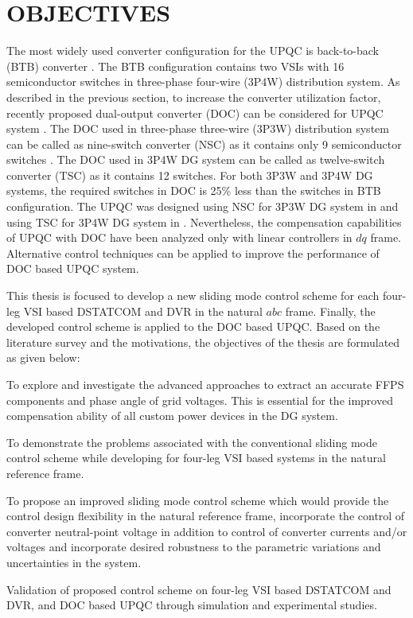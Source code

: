  \section{OBJECTIVES}

The most widely used converter configuration for the UPQC is back-to-back (BTB) converter \cite{6095377, iet-pel.2010.0134, 5688329,5393074, ghosh2001unified, 5235743,5672403, 4483694}. The BTB configuration contains two VSIs with 16 semiconductor switches in three-phase four-wire (3P4W) distribution system. As described in the previous section, to increase the converter utilization factor, recently proposed dual-output converter (DOC) can be considered for UPQC system \cite{4348103}. The DOC used in three-phase three-wire (3P3W) distribution system can be called as nine-switch converter (NSC) as it contains only 9 semiconductor switches \cite{5713844}.  The DOC used in 3P4W DG system can be called as twelve-switch converter (TSC) as it contains 12 switches. For both 3P3W and 3P4W DG systems, the required switches in DOC is 25\% less than the switches in BTB configuration. The UPQC was designed using NSC for 3P3W DG system in \cite{5713844,7018088} and using TSC for 3P4W DG system in \cite{6301686}. Nevertheless, the compensation capabilities of UPQC with DOC have been analyzed only with linear controllers in $dq$ frame. Alternative control techniques can be applied to improve the performance of DOC based UPQC system.    

This thesis is focused to develop a new sliding mode control scheme for each four-leg VSI based DSTATCOM and DVR in the natural $abc$ frame. Finally, the developed control scheme is applied to the DOC based UPQC. Based on the literature survey and the motivations, the objectives of the thesis are formulated as given below:

\begin{enumerate}
\begin{spacing}{1.5}
\item To explore and investigate the advanced approaches to extract an accurate FFPS components and phase angle of grid voltages. This is essential for the improved compensation ability of all custom power devices in the DG system.

\item{To demonstrate the problems associated with the conventional sliding mode control scheme while developing for four-leg VSI based systems in the natural reference frame.} 

\item To propose an improved sliding mode control scheme which would provide the control design flexibility in the natural reference frame, incorporate the control of converter neutral-point voltage in addition to control of converter currents and/or voltages and incorporate desired robustness to the parametric variations and uncertainties in the system. 

\item{Validation of proposed control scheme on four-leg VSI based DSTATCOM and DVR, and DOC based UPQC through simulation and experimental studies.}
\end{spacing}
\end{enumerate}


